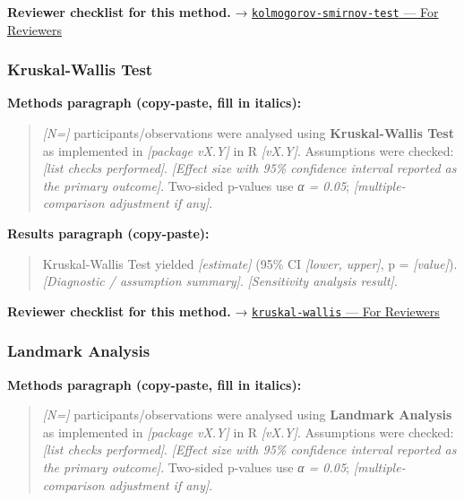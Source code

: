 \documentclass[
]{article}
\begin{document}
\textbf{Reviewer checklist for this method.} →
\href{../chapters/04-inferential/kolmogorov-smirnov-test.Rmd\#for-reviewers}{\texttt{kolmogorov-smirnov-test}
--- For Reviewers}

\subsubsection{Kruskal-Wallis Test}\label{kruskal-wallis-test}

\textbf{Methods paragraph (copy-paste, fill in italics):}

\begin{quote}
\emph{{[}N={]}} participants/observations were analysed using
\textbf{Kruskal-Wallis Test} as implemented in \emph{{[}package vX.Y{]}}
in R \emph{{[}vX.Y{]}}. Assumptions were checked: \emph{{[}list checks
performed{]}}. \emph{{[}Effect size with 95\% confidence interval
reported as the primary outcome{]}}. Two-sided p-values use \emph{α =
0.05}; \emph{{[}multiple-comparison adjustment if any{]}}.
\end{quote}

\textbf{Results paragraph (copy-paste):}

\begin{quote}
Kruskal-Wallis Test yielded \emph{{[}estimate{]}} (95\% CI
\emph{{[}lower, upper{]}}, p = \emph{{[}value{]}}). \emph{{[}Diagnostic
/ assumption summary{]}}. \emph{{[}Sensitivity analysis result{]}}.
\end{quote}

\textbf{Reviewer checklist for this method.} →
\href{../chapters/04-inferential/kruskal-wallis.Rmd\#for-reviewers}{\texttt{kruskal-wallis}
--- For Reviewers}

\subsubsection{Landmark Analysis}\label{landmark-analysis}

\textbf{Methods paragraph (copy-paste, fill in italics):}

\begin{quote}
\emph{{[}N={]}} participants/observations were analysed using
\textbf{Landmark Analysis} as implemented in \emph{{[}package vX.Y{]}}
in R \emph{{[}vX.Y{]}}. Assumptions were checked: \emph{{[}list checks
performed{]}}. \emph{{[}Effect size with 95\% confidence interval
reported as the primary outcome{]}}. Two-sided p-values use \emph{α =
0.05}; \emph{{[}multiple-comparison adjustment if any{]}}.
\end{quote}
\end{document}
